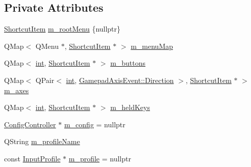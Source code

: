 \subsection*{Private Attributes}
\begin{DoxyCompactItemize}
\item 
\mbox{\hyperlink{class_q_g_b_a_1_1_shortcut_controller_1_1_shortcut_item}{Shortcut\+Item}} \mbox{\hyperlink{class_q_g_b_a_1_1_shortcut_controller_a00a5c5aceaa83810ea245dc6206fadcc}{m\+\_\+root\+Menu}} \{nullptr\}
\item 
Q\+Map$<$ Q\+Menu $\ast$, \mbox{\hyperlink{class_q_g_b_a_1_1_shortcut_controller_1_1_shortcut_item}{Shortcut\+Item}} $\ast$ $>$ \mbox{\hyperlink{class_q_g_b_a_1_1_shortcut_controller_ad1ebe374156db025778c2850af505410}{m\+\_\+menu\+Map}}
\item 
Q\+Map$<$ \mbox{\hyperlink{ioapi_8h_a787fa3cf048117ba7123753c1e74fcd6}{int}}, \mbox{\hyperlink{class_q_g_b_a_1_1_shortcut_controller_1_1_shortcut_item}{Shortcut\+Item}} $\ast$ $>$ \mbox{\hyperlink{class_q_g_b_a_1_1_shortcut_controller_ac5ff72422f2dfc6ff828ce169de5f723}{m\+\_\+buttons}}
\item 
Q\+Map$<$ Q\+Pair$<$ \mbox{\hyperlink{ioapi_8h_a787fa3cf048117ba7123753c1e74fcd6}{int}}, \mbox{\hyperlink{class_q_g_b_a_1_1_gamepad_axis_event_a5d50ab74dce4e58252f2affb5f227bbc}{Gamepad\+Axis\+Event\+::\+Direction}} $>$, \mbox{\hyperlink{class_q_g_b_a_1_1_shortcut_controller_1_1_shortcut_item}{Shortcut\+Item}} $\ast$ $>$ \mbox{\hyperlink{class_q_g_b_a_1_1_shortcut_controller_a24b7006ddce4ea8ab2be8be8d184bf71}{m\+\_\+axes}}
\item 
Q\+Map$<$ \mbox{\hyperlink{ioapi_8h_a787fa3cf048117ba7123753c1e74fcd6}{int}}, \mbox{\hyperlink{class_q_g_b_a_1_1_shortcut_controller_1_1_shortcut_item}{Shortcut\+Item}} $\ast$ $>$ \mbox{\hyperlink{class_q_g_b_a_1_1_shortcut_controller_a31ff180125c8c1b74bdeb07ea6cd38ae}{m\+\_\+held\+Keys}}
\item 
\mbox{\hyperlink{class_q_g_b_a_1_1_config_controller}{Config\+Controller}} $\ast$ \mbox{\hyperlink{class_q_g_b_a_1_1_shortcut_controller_a6108f6d640857c9473ec9d01edb4d87a}{m\+\_\+config}} = nullptr
\item 
Q\+String \mbox{\hyperlink{class_q_g_b_a_1_1_shortcut_controller_a615dd5f86c42d38522b81fbbb5130be2}{m\+\_\+profile\+Name}}
\item 
const \mbox{\hyperlink{class_q_g_b_a_1_1_input_profile}{Input\+Profile}} $\ast$ \mbox{\hyperlink{class_q_g_b_a_1_1_shortcut_controller_a9c5a5364f1f6b2910ca44443bdb921de}{m\+\_\+profile}} = nullptr
\end{DoxyCompactItemize}
